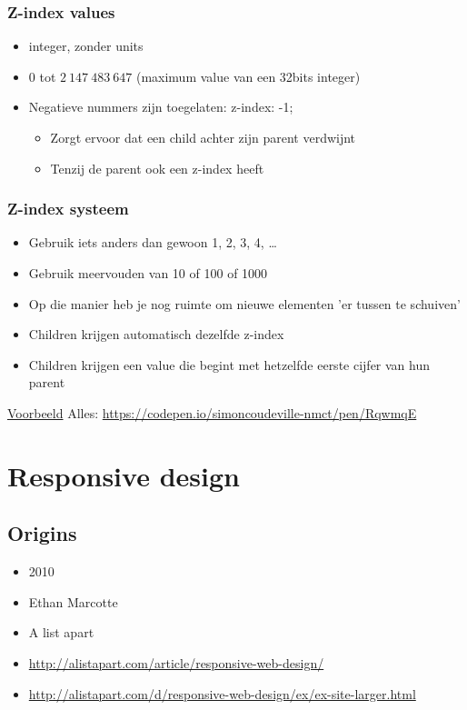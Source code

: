 \documentclass{article}
\begin{document}
\subsubsection{Z-index values}
\begin{itemize}
    \item integer, zonder units
    \item $0$ tot $2\ 147\ 483\ 647$ (maximum value van een 32bits integer)
    \item Negatieve nummers zijn toegelaten: z-index: -1;
    \begin{itemize}
        \item Zorgt ervoor dat een child achter zijn parent verdwijnt
        \item Tenzij de parent ook een z-index heeft
    \end{itemize}
\end{itemize}

\subsubsection{Z-index systeem}
\begin{itemize}
    \item Gebruik iets anders dan gewoon 1, 2, 3, 4, \dots
    \item Gebruik meervouden van 10 of 100 of 1000
    \item Op die manier heb je nog ruimte om nieuwe elementen 'er tussen te schuiven'
    \item Children krijgen automatisch dezelfde z-index
    \item Children krijgen een value die begint met hetzelfde eerste cijfer van hun parent
\end{itemize}


\underline{Voorbeeld} Alles: \url{https://codepen.io/simoncoudeville-nmct/pen/RqwmqE}

\section{Responsive design}
\subsection{Origins}
\begin{itemize}
    \item 2010
    \item Ethan Marcotte
    \item A list apart
    \item \url{http://alistapart.com/article/responsive-web-design/}
    \item \url{http://alistapart.com/d/responsive-web-design/ex/ex-site-larger.html}
\end{itemize}
\end{document}
